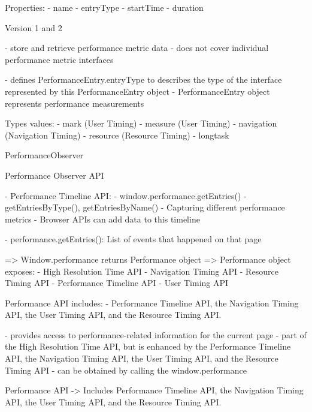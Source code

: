 Properties:
- name
- entryType
- startTime
- duration

	
	

Version 1 and 2

- store and retrieve performance metric data
- does not cover individual performance metric interfaces


- defines PerformanceEntry.entryType to describes the type of the interface represented by this PerformanceEntry object
- PerformanceEntry object represents performance measurements


Types values:
- mark (User Timing)
- measure (User Timing)
- navigation (Navigation Timing)
- resource (Resource Timing)
- longtask



PerformanceObserver

Performance Observer API %


- Performance Timeline API:
	- window.performance.getEntries()
	- getEntriesByType(), getEntriesByName()
	- Capturing different performance metrics
	- Browser APIs can add data to this timeline

	- performance.getEntries(): List of events that happened on that page
	
	

=> Window.performance returns Performance object
=> Performance object exposes:
	- High Resolution Time API
	- Navigation Timing API
	- Resource Timing API
	- Performance Timeline API
	- User Timing API
	

Performance API includes:
- Performance Timeline API, the Navigation Timing API, the User Timing API, and the Resource Timing API.


- provides access to performance-related information for the current page
- part of the High Resolution Time API, but is enhanced by the Performance Timeline API, the Navigation Timing API, the User Timing API, and the Resource Timing API
- can be obtained by calling the window.performance


Performance API 
-> Includes Performance Timeline API, the Navigation Timing API, the User Timing API, and the Resource Timing API.


